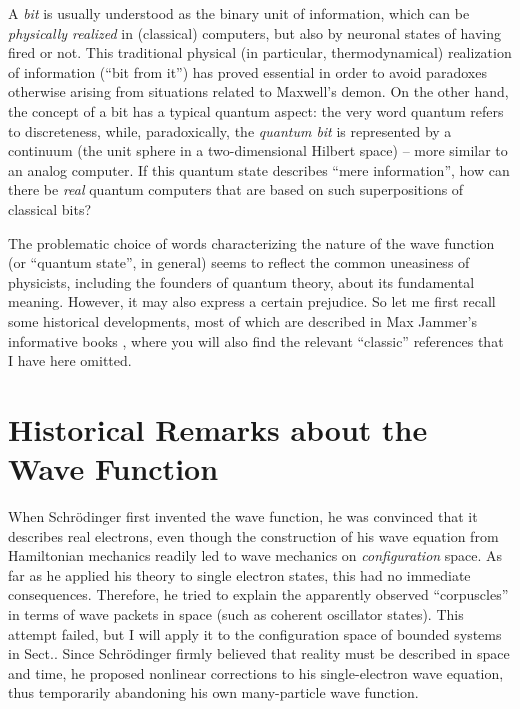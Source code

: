 A {\it bit} is usually understood as the binary unit of information,
which can be {\it physically realized} in (classical) computers, but
also by neuronal states of having fired or not. This traditional
physical (in particular, thermodynamical) realization of information
(``bit from it'') has proved essential in order to avoid
paradoxes otherwise arising from situations related to Maxwell's
demon. On the other hand, the concept of a bit has a typical quantum
aspect: the very word quantum refers to discreteness, while,
paradoxically, the {\it quantum bit} is represented by a continuum
(the unit sphere in a two-dimensional Hilbert space) -- more similar
to an analog computer. If this quantum state
describes ``mere information'', how can there be {\it real} quantum
computers that are based on such superpositions of classical bits?

The problematic choice of words characterizing the nature of the wave
function (or ``quantum state'', in general) seems to reflect the common
uneasiness of physicists, including the founders of quantum theory,
about its fundamental meaning. However, it may also express a certain
prejudice. So let me first recall some historical developments,
most of which are described in Max Jammer's informative
books \cite{Jammer}, where you will also find the relevant ``classic''
references that I have here omitted.


\section{Historical Remarks about the  Wave Function}
When Schr\"odinger first invented the wave function, he was
convinced that it  describes real electrons, even though the
construction of his wave equation from Hamiltonian mechanics readily
led to wave mechanics on {\it configuration} space. As far as he
applied his theory to single electron states, this had no immediate
consequences. Therefore, he tried to explain the apparently observed
``corpuscles'' in terms of wave packets in space (such as coherent
oscillator states). This attempt failed, but I will apply it to the
configuration space of bounded systems in Sect.. Since
Schr\"odinger firmly believed that reality must be described in space
and time, he proposed nonlinear corrections to his single-electron
wave equation, thus temporarily abandoning his own many-particle wave
function.

